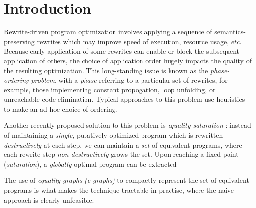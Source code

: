 
\newcommand\mylet[2]{\textsf{let } #1 = #2 \textsf{ in }}


\cite{heijltjes_functional_2023}
\cite{barrett_functional_2023}
\cite{griggio_proceedings_2022}
\cite{flatt_small_2022}
\cite{ghica_operational_2021}
\cite{ghica_hierarchical_2023}
\cite{ghica_rewriting_2023} %
\cite{wilson_string_2023} %

\cite{zhang_relational_2022} %
\cite{alvarez-picallo_rewriting_2022} %
\cite{alvarez-picallo_functorial_2021} %

\cite{bonchi_tape_nodate} %
\cite{baldan_categorical_2014} %
\cite{dpo}
\cite{maclane}
\cite{singher2023colored}
\cite{koehler2022sketchguided} %



\section{Introduction}

Rewrite-driven program optimization involves applying a sequence of semantics-preserving rewrites which may improve speed of execution, resource usage, \textit{etc}. Because early application of some rewrites can enable or block the subsequent application of others, the choice of application order hugely impacts the quality of the resulting optimization.  This long-standing issue is known as the \textit{phase-ordering problem}, with a \textit{phase} referring to a particular set of rewrites, for example,  those implementing constant propogation, loop unfolding, or unreachable code elimination. Typical approaches to this problem use heuristics to make an ad-hoc choice of ordering. 

Another recently proposed solution to this problem is \textit{equality saturation} 
\cite{10.1145/1594834.1480915,EggPaper}: instead of maintaining a \textit{single},  putatively optimized program which is rewritten \textit{destructively} at each step, we can maintain a \textit{set} of equivalent programs, where each rewrite step \textit{non-destructively} grows the set.  Upon reaching a fixed point (\textit{saturation}),  a \textit{globally} optimal program can be extracted%

The use of \textit{equality graphs (e-graphs)} to compactly represent the set of equivalent programs is what makes the technique tractable in practise, where the naive approach is clearly unfeasible. 

